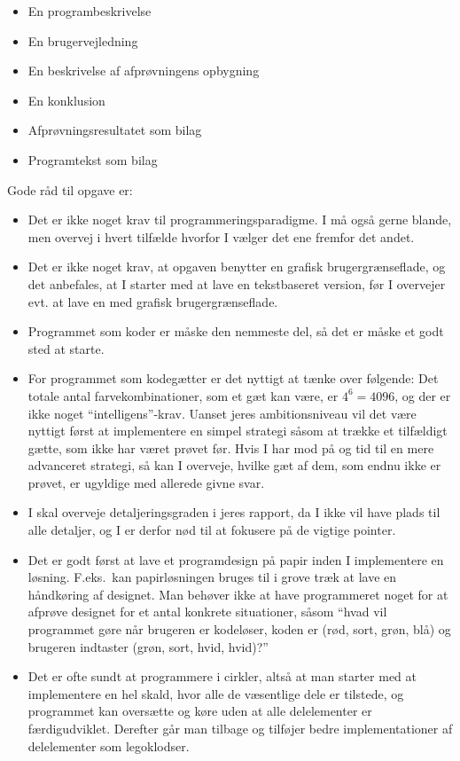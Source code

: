 \documentclass[a4paper,12pt]{article}
\begin{document}
\begin{enumerate}[label=8g.\arabic*,start=0]
\begin{itemize}
\begin{itemize}
    \item En programbeskrivelse
    \item En brugervejledning
    \item En beskrivelse af afprøvningens opbygning
    \item En konklusion
    \item Afprøvningsresultatet som bilag
    \item Programtekst som bilag
    \end{itemize}
  \end{itemize}
  Gode råd til opgave er:
  \begin{itemize}
  \item Det er ikke noget krav til programmeringsparadigme. I må også gerne blande, men overvej i hvert tilfælde hvorfor I vælger det ene fremfor det andet.
  \item Det er ikke noget krav, at opgaven benytter en grafisk brugergrænseflade, og det anbefales, at I starter med at lave en tekstbaseret version, før I overvejer evt. at lave en med grafisk brugergrænseflade.
  \item Programmet som koder er måske den nemmeste del, så det er måske et godt sted at starte.
  \item For programmet som kodegætter er det nyttigt at tænke over følgende: Det totale antal farvekombinationer, som et gæt kan være, er $4^6=4096$, og der er ikke noget ``intelligens''-krav. Uanset jeres ambitionsniveau vil det være nyttigt først at implementere en simpel strategi såsom at trække et tilfældigt gætte, som ikke har været prøvet før. Hvis I har mod på og tid til en mere advanceret strategi, så kan I overveje, hvilke gæt af dem, som endnu ikke er prøvet, er ugyldige med allerede givne svar.
  \item I skal overveje detaljeringsgraden i jeres rapport, da I ikke vil have plads til alle detaljer, og I er derfor nød til at fokusere på de vigtige pointer.
  \item Det er godt først at lave et programdesign på papir inden I implementere en løsning. F.eks.\ kan papirløsningen bruges til i grove træk at lave en håndkøring af designet. Man behøver ikke at have programmeret noget for at afprøve designet for et antal konkrete situationer, såsom ``hvad vil programmet gøre når brugeren er kodeløser, koden er (rød, sort, grøn, blå) og brugeren indtaster (grøn, sort, hvid, hvid)?''
  \item Det er ofte sundt at programmere i cirkler, altså at man starter med at implementere en hel skald, hvor alle de væsentlige dele er tilstede, og programmet kan oversætte og køre uden at alle delelementer er færdigudviklet. Derefter går man tilbage og tilføjer bedre implementationer af delelementer som legoklodser.

\end{itemize}
\end{enumerate}
\end{document}

